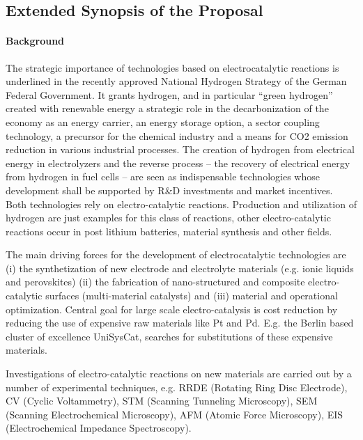 \documentclass[a4paper,10pt]{article}
\begin{document}
\insertProjectHeader


\subsection*{Extended Synopsis of the Proposal}

\paragraph{Background}



The strategic importance of technologies based on electrocatalytic reactions is underlined in the recently approved National Hydrogen Strategy of the German Federal Government.  It grants hydrogen, and in particular ``green hydrogen'' created with renewable energy a strategic role in the decarbonization of the economy as an energy carrier, an energy storage option, a sector coupling technology, a precursor for the chemical industry and a means for CO2 emission reduction in various industrial processes.
The creation of hydrogen from electrical energy in electrolyzers and the reverse process -- the recovery of electrical energy from hydrogen in fuel cells -- are seen as indispensable technologies whose development shall be supported by R\&D investments and market incentives.
%
Both technologies rely on electro-catalytic reactions. Production and utilization of hydrogen are just examples for this class of reactions, other electro-catalytic reactions occur in post lithium batteries, material synthesis and other fields.

The main driving forces for the development of electrocatalytic technologies are (i) the synthetization of new electrode and electrolyte materials (e.g. ionic liquids and perovskites) (ii) the fabrication of nano-structured and composite electro-catalytic surfaces (multi-material catalysts) and (iii) material and operational optimization. Central goal for large scale electro-catalysis is cost
reduction by reducing the use of expensive raw materials like Pt and  Pd. E.g. the Berlin based cluster of excellence UniSysCat, searches for substitutions of these expensive materials.

Investigations of electro-catalytic reactions on new materials  
are carried out by a number of  experimental techniques,  e.g.
RRDE    (Rotating   Ring    Disc   Electrode),   
CV  (Cyclic  Voltammetry),  
STM (Scanning Tunneling Microscopy), 
SEM (Scanning  Electrochemical Microscopy),
AFM (Atomic Force Microscopy), 
EIS (Electrochemical Impedance Spectroscopy).
\end{document}
